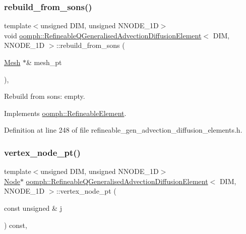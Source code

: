 \subsubsection{\texorpdfstring{rebuild\+\_\+from\+\_\+sons()}{rebuild\_from\_sons()}}
{\footnotesize\ttfamily template$<$unsigned D\+IM, unsigned N\+N\+O\+D\+E\+\_\+1D$>$ \\
void \hyperlink{classoomph_1_1RefineableQGeneralisedAdvectionDiffusionElement}{oomph\+::\+Refineable\+Q\+Generalised\+Advection\+Diffusion\+Element}$<$ D\+IM, N\+N\+O\+D\+E\+\_\+1D $>$\+::rebuild\+\_\+from\+\_\+sons (\begin{DoxyParamCaption}\item[{\hyperlink{classoomph_1_1Mesh}{Mesh} $\ast$\&}]{mesh\+\_\+pt }\end{DoxyParamCaption})\hspace{0.3cm}{\ttfamily [inline]}, {\ttfamily [virtual]}}



Rebuild from sons\+: empty. 



Implements \hyperlink{classoomph_1_1RefineableElement_a33324be27833fa4b78279d17158215fa}{oomph\+::\+Refineable\+Element}.



Definition at line 248 of file refineable\+\_\+gen\+\_\+advection\+\_\+diffusion\+\_\+elements.\+h.

\mbox{\label{classoomph_1_1RefineableQGeneralisedAdvectionDiffusionElement_a24d593b020485e3786c1e4ae0dbaae6c}} 
\subsubsection{\texorpdfstring{vertex\+\_\+node\+\_\+pt()}{vertex\_node\_pt()}}
{\footnotesize\ttfamily template$<$unsigned D\+IM, unsigned N\+N\+O\+D\+E\+\_\+1D$>$ \\
\hyperlink{classoomph_1_1Node}{Node}$\ast$ \hyperlink{classoomph_1_1RefineableQGeneralisedAdvectionDiffusionElement}{oomph\+::\+Refineable\+Q\+Generalised\+Advection\+Diffusion\+Element}$<$ D\+IM, N\+N\+O\+D\+E\+\_\+1D $>$\+::vertex\+\_\+node\+\_\+pt (\begin{DoxyParamCaption}\item[{const unsigned \&}]{j }\end{DoxyParamCaption}) const\hspace{0.3cm}{\ttfamily [inline]}, {\ttfamily [virtual]}}



